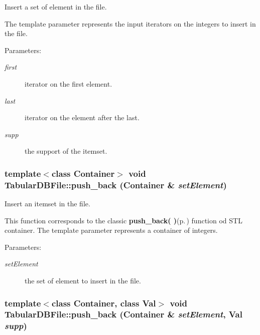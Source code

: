 Insert a set of element in the file. 

The template parameter represents the input iterators on the integers to insert in the file. \begin{Desc}
\item[Parameters:]
\begin{description}
\item[{\em first}]iterator on the first element. \item[{\em last}]iterator on the element after the last. \item[{\em supp}]the support of the itemset. \end{description}
\end{Desc}
\subsubsection{\setlength{\rightskip}{0pt plus 5cm}template$<$class Container$>$ void Tabular\-DBFile::push\_\-back (Container \& {\em set\-Element})\hspace{0.3cm}{\tt  [inline]}}\label{class_tabular_d_b_file_6a6bac3812d26f797c4544beb8437d27}


Insert an itemset in the file. 

This function corresponds to the classic {\bf push\_\-back( )}{\rm (p.\,\pageref{class_tabular_d_b_file_548d79f25d83bd10f9dbfbf542d22b1a})} function od STL container. The template parameter represents a container of integers. \begin{Desc}
\item[Parameters:]
\begin{description}
\item[{\em set\-Element}]the set of element to insert in the file. \end{description}
\end{Desc}
\subsubsection{\setlength{\rightskip}{0pt plus 5cm}template$<$class Container, class Val$>$ void Tabular\-DBFile::push\_\-back (Container \& {\em set\-Element}, Val {\em supp})\hspace{0.3cm}{\tt  [inline]}}\label{class_tabular_d_b_file_548d79f25d83bd10f9dbfbf542d22b1a}


